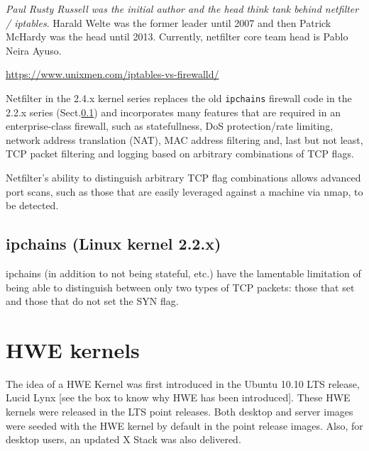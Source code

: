 \begin{mdframed}

{\it Paul Rusty Russell was the initial author and the head think tank behind
netfilter / iptables}. Harald Welte was the former leader until 2007 and then
Patrick McHardy was the head until 2013. Currently, netfilter core team head is
Pablo Neira Ayuso. 

\url{https://www.unixmen.com/iptables-vs-firewalld/}
\end{mdframed}

Netfilter in the 2.4.x kernel series replaces the old \verb!ipchains! firewall
code in the 2.2.x series (Sect.\ref{sec:ipchains}) and incorporates many
features that are required in an enterprise-class firewall, such as
statefullness, DoS protection/rate limiting, network address translation (NAT),
MAC address filtering and, last but not least, TCP packet filtering and logging
based on arbitrary combinations of TCP flags.

Netfilter's ability to distinguish arbitrary TCP flag combinations allows
advanced port scans, such as those that are easily leveraged against a machine
via nmap, to be detected.

\subsection{ipchains (Linux kernel 2.2.x)}
\label{sec:ipchains}


ipchains (in addition to not being stateful, etc.) have the lamentable
limitation of being able to distinguish between only two types of TCP packets:
those that set and those that do not set the SYN flag.  


\section{HWE kernels}
\label{sec:HWE-kernels}

The idea of a HWE Kernel was first introduced in the Ubuntu 10.10 LTS release,
Lucid Lynx [see the box to know why HWE has been introduced].
These HWE kernels were released in the LTS point releases. Both desktop and
server images were seeded with the HWE kernel by default in the point release
images. Also, for desktop users, an updated X Stack was also delivered.


